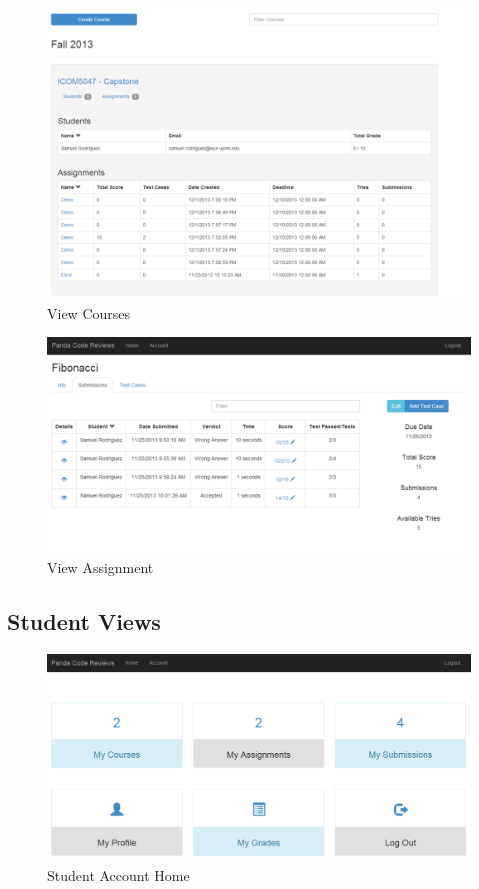 \begin{figure}[H]
	\centering
	\includegraphics[width=\textwidth]{img/course-prof-screen}
	\caption{View Courses}
\end{figure}

\begin{figure}[H]
	\centering
	\includegraphics[width=\textwidth]{img/assignment-prof-screen}
	\caption{View Assignment}
\end{figure}

\subsection{Student Views}

\begin{figure}[H]
	\centering
	\includegraphics[width=\textwidth]{img/homestudent-screen}
	\caption{Student Account Home}
\end{figure}


